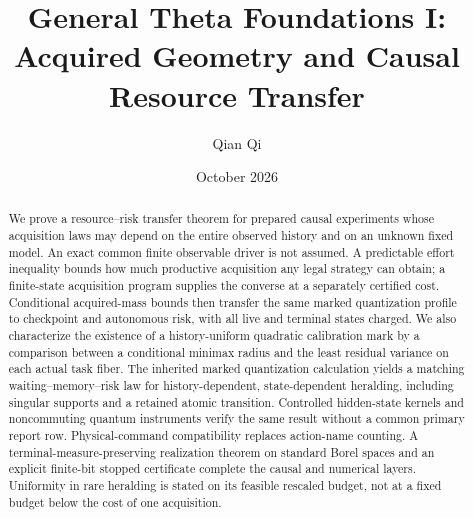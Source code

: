 \documentclass[11pt,reqno]{amsart}
\title[Acquired geometry and causal resource transfer]{General Theta Foundations I:\\Acquired Geometry and Causal Resource Transfer}
\author{Qian Qi}
\date{October 2026}
\numberwithin{equation}{section}
\theoremstyle{definition}
\theoremstyle{remark}
\begin{document}
\begin{abstract}
We prove a resource--risk transfer theorem for prepared causal experiments whose acquisition laws may depend on the entire observed history and on an unknown fixed model. An exact common finite observable driver is not assumed. A predictable effort inequality bounds how much productive acquisition any legal strategy can obtain; a finite-state acquisition program supplies the converse at a separately certified cost. Conditional acquired-mass bounds then transfer the same marked quantization profile to checkpoint and autonomous risk, with all live and terminal states charged. We also characterize the existence of a history-uniform quadratic calibration mark by a comparison between a conditional minimax radius and the least residual variance on each actual task fiber. The inherited marked quantization calculation yields a matching waiting--memory--risk law for history-dependent, state-dependent heralding, including singular supports and a retained atomic transition. Controlled hidden-state kernels and noncommuting quantum instruments verify the same result without a common primary report row. Physical-command compatibility replaces action-name counting. A terminal-measure-preserving realization theorem on standard Borel spaces and an explicit finite-bit stopped certificate complete the causal and numerical layers. Uniformity in rare heralding is stated on its feasible rescaled budget, not at a fixed budget below the cost of one acquisition.
\end{abstract}
\maketitle










\appendix



\end{document}

